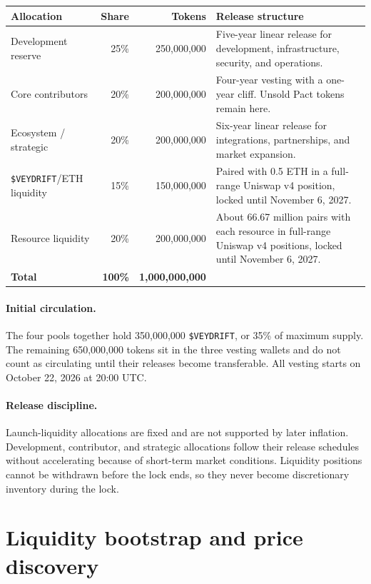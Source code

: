 \documentclass[11pt]{article}
\newcommand{\token}[1]{\texttt{\$#1}}
\begin{document}
\small
\begin{tabularx}{\textwidth}{@{}p{} r r X@{}}
\toprule
\textbf{Allocation} & \textbf{Share} & \textbf{Tokens} & \textbf{Release structure} \\
\midrule
Development reserve & 25\% & 250,000,000 & Five-year linear release for development, infrastructure, security, and operations. \\
Core contributors & 20\% & 200,000,000 & Four-year vesting with a one-year cliff. Unsold Pact tokens remain here. \\
Ecosystem / strategic & 20\% & 200,000,000 & Six-year linear release for integrations, partnerships, and market expansion. \\
\token{VEYDRIFT}/ETH liquidity & 15\% & 150,000,000 & Paired with 0.5 ETH in a full-range Uniswap v4 position, locked until November 6, 2027. \\
Resource liquidity & 20\% & 200,000,000 & About 66.67 million pairs with each resource in full-range Uniswap v4 positions, locked until November 6, 2027. \\
\midrule
\textbf{Total} & \textbf{100\%} & \textbf{1,000,000,000} & \\
\bottomrule
\end{tabularx}
\normalsize

\paragraph{Initial circulation.} The four pools together hold 350,000,000 \token{VEYDRIFT}, or 35\% of maximum supply. The remaining 650,000,000 tokens sit in the three vesting wallets and do not count as circulating until their releases become transferable. All vesting starts on October 22, 2026 at 20:00 UTC.

\paragraph{Release discipline.} Launch-liquidity allocations are fixed and are not supported by later inflation. Development, contributor, and strategic allocations follow their release schedules without accelerating because of short-term market conditions. Liquidity positions cannot be withdrawn before the lock ends, so they never become discretionary inventory during the lock.

\section{Liquidity bootstrap and price discovery}\label{sec:liquidity}
\end{document}
